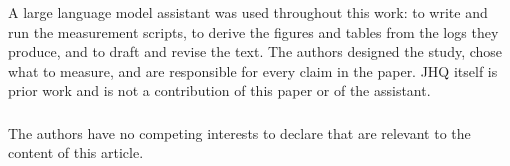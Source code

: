 \documentclass[runningheads]{llncs}
\begin{document}
\begin{credits}
\subsubsection{\ackname}
A large language model assistant was used throughout this work: to write and
run the measurement scripts, to derive the figures and tables from the logs
they produce, and to draft and revise the text. The authors designed the
study, chose what to measure, and are responsible for every claim in the
paper. JHQ itself is prior work and is not a contribution of this paper or of
the assistant.

\subsubsection{\discintname}
The authors have no competing interests to declare that are relevant to the
content of this article.
\end{credits}



\end{document}
